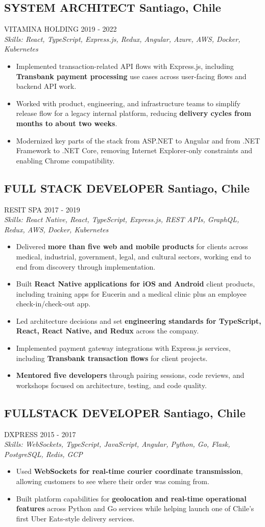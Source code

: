 \documentclass{article}
\newcommand{\WorkExperience}[2]{
   \subsection*{#1}
   \vspace{-1em}
   \uppercase{#2}
}
\newcommand{\Skills}[1]{
   \textit{Skills: #1}
}
\begin{document}
\WorkExperience{SYSTEM ARCHITECT \hfill Santiago, Chile}{Vitamina Holding \hfill 2019 {-} 2022} \\
\Skills{React, TypeScript, Express.js, Redux, Angular, Azure, AWS, Docker, Kubernetes}
\begin{itemize}
	\item Implemented transaction-related API flows with Express.js, including \textbf{Transbank payment processing} use cases across user-facing flows and backend API work.
	\item Worked with product, engineering, and infrastructure teams to simplify release flow for a legacy internal platform, reducing \textbf{delivery cycles from months to about two weeks}.
	\item Modernized key parts of the stack from ASP.NET to Angular and from .NET Framework to .NET Core, removing Internet Explorer-only constraints and enabling Chrome compatibility.
\end{itemize}

\WorkExperience{FULL STACK DEVELOPER \hfill Santiago, Chile}{Resit SPA \hfill 2017 {-} 2019} \\
\Skills{React Native, React, TypeScript, Express.js, REST APIs, GraphQL, Redux, AWS, Docker, Kubernetes}
\begin{itemize}
	\item Delivered \textbf{more than five web and mobile products} for clients across medical, industrial, government, legal, and cultural sectors, working end to end from discovery through implementation.
	\item Built \textbf{React Native applications for iOS and Android} client products, including training apps for Eucerin and a medical clinic plus an employee check-in/check-out app.
	\item Led architecture decisions and set \textbf{engineering standards for TypeScript, React, React Native, and Redux} across the company.
	\item Implemented payment gateway integrations with Express.js services, including \textbf{Transbank transaction flows} for client projects.
	\item \textbf{Mentored five developers} through pairing sessions, code reviews, and workshops focused on architecture, testing, and code quality.
\end{itemize}

\WorkExperience{FULLSTACK DEVELOPER \hfill Santiago, Chile}{Dxpress \hfill 2015 {-} 2017} \\
\Skills{WebSockets, TypeScript, JavaScript, Angular, Python, Go, Flask, PostgreSQL, Redis, GCP}
\begin{itemize}
	\item Used \textbf{WebSockets for real-time courier coordinate transmission}, allowing customers to see where their order was coming from.
	\item Built platform capabilities for \textbf{geolocation and real-time operational features} across Python and Go services while helping launch one of Chile’s first Uber Eats-style delivery services.
\end{itemize}
\end{document}
